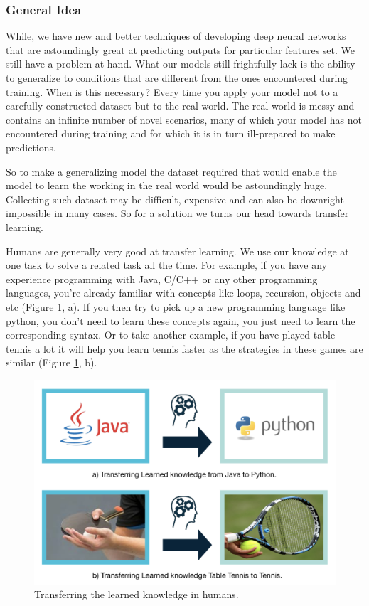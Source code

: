 \documentclass[a4paper, 12pt]{article}
\begin{document}
\begin{sloppypar}
\subsubsection{General Idea}
While, we have new and better techniques of developing deep neural networks that are astoundingly great at predicting outputs for particular features set. We still have a problem at hand. What our models still frightfully lack is the ability to generalize to conditions that are different from the ones encountered during training. When is this necessary? Every time you apply your model not to a carefully constructed dataset but to the real world. The real world is messy and contains an infinite number of novel scenarios, many of which your model has not encountered during training and for which it is in turn ill-prepared to make predictions.\cite{noauthor_transfer_2017}

So to make a generalizing model the dataset required that would enable the model to learn the working in the real world would be astoundingly huge. Collecting such dataset may be difficult, expensive and can also be downright impossible in many cases. So for a solution we turns our head towards transfer learning.

Humans are generally very good at transfer learning. We use our knowledge at one task to solve a related task all the time. For example, if you have any experience programming with Java, C/C++ or any other programming languages, you’re already familiar with concepts like loops, recursion, objects and etc (Figure \ref{human}, a). If you then try to pick up a new programming language like python, you don't need to learn these concepts again, you just need to learn the corresponding syntax. Or to take another example, if you have played table tennis a lot it will help you learn tennis faster as the strategies in these games are similar (Figure \ref{human}, b). %

\begin{figure}[H]
\begin{center}
\includegraphics[scale=0.25]{human_lt.png}
\caption{Transferring the learned knowledge in humans.\label{human}} %
\end{center}
\end{figure}


\end{sloppypar}
\end{document}
